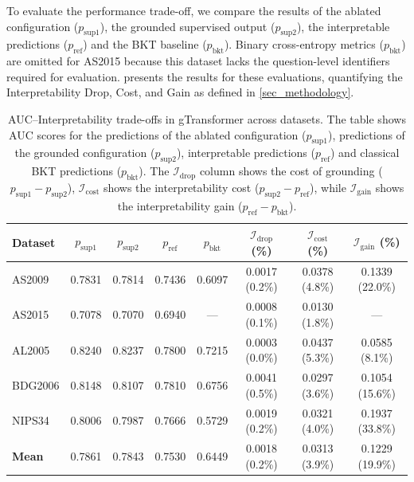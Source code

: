 \documentclass[applsci,article,submit,moreauthors,pdftex]{Definitions/mdpi}
\begin{document}
To evaluate the performance trade-off, we compare the results of the ablated configuration ($p_{\text{sup}1}$), the grounded supervised output ($p_{\text{sup}2}$), the interpretable predictions ($p_{\text{ref}}$) and the BKT baseline ($p_{\text{bkt}}$). Binary cross-entropy metrics ($p_{\text{bkt}}$) are omitted for AS2015 because this dataset lacks the question-level identifiers required for evaluation.  presents the results for these evaluations, quantifying the Interpretability Drop, Cost, and Gain as defined in \cref{sec_methodology}. 


\begin{table}[htbp]
\centering
\small
\begin{tabular}{lccccccc}
\toprule
\textbf{Dataset} & $p_{\text{sup}1}$ & $p_{\text{sup}2}$ & $p_{\text{ref}}$ & $p_{\text{bkt}}$ & $\mathcal{I}_{\text{drop}}$ (\%) & $\mathcal{I}_{\text{cost}}$ (\%) & $\mathcal{I}_{\text{gain}}$ (\%) \\
\midrule
AS2009 & 0.7831 & 0.7814 & 0.7436 & 0.6097 & 0.0017 (0.2\%) & 0.0378 (4.8\%) & 0.1339 (22.0\%) \\
AS2015 & 0.7078 & 0.7070 & 0.6940 & --- & 0.0008 (0.1\%) & 0.0130 (1.8\%) & --- \\
AL2005 & 0.8240 & 0.8237 & 0.7800 & 0.7215 & 0.0003 (0.0\%) & 0.0437 (5.3\%) & 0.0585 (8.1\%) \\
BDG2006 & 0.8148 & 0.8107 & 0.7810 & 0.6756 & 0.0041 (0.5\%) & 0.0297 (3.6\%) & 0.1054 (15.6\%) \\
NIPS34 & 0.8006 & 0.7987 & 0.7666 & 0.5729 & 0.0019 (0.2\%) & 0.0321 (4.0\%) & 0.1937 (33.8\%) \\
\midrule
\textbf{Mean} & 0.7861 & 0.7843 & 0.7530 & 0.6449 & 0.0018 (0.2\%) & 0.0313 (3.9\%) & 0.1229 (19.9\%) \\
\bottomrule
\end{tabular}
\caption{AUC--Interpretability trade-offs in gTransformer across datasets. The table shows AUC scores for the predictions of the ablated configuration ($p_{\text{sup}1}$), predictions of the grounded configuration ($p_{\text{sup}2}$), interpretable predictions ($p_{\text{ref}}$) and classical BKT predictions ($p_{\text{bkt}}$). The $\mathcal{I}_{\text{drop}}$ column shows the cost of grounding ($p_{\text{sup}1} - p_{\text{sup}2}$), $\mathcal{I}_{\text{cost}}$ shows the interpretability cost ($p_{\text{sup}2} - p_{\text{ref}}$), while $\mathcal{I}_{\text{gain}}$ shows the interpretability gain ($p_{\text{ref}} - p_{\text{bkt}}$).}
\label{tab:tradeoff}
\end{table}
\end{document}
